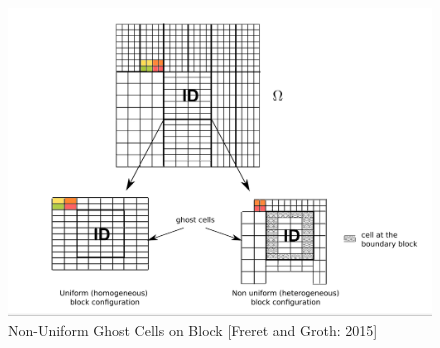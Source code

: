\begin{enumerate}
\begin{figure}
    \vspace{0.2cm}
    \begin{center}
      \includegraphics[height=0.35\textwidth]{./figs/Non-UniformBlock.png}
    \end{center}
    \caption{Non-Uniform Ghost Cells on Block [Freret and Groth: 2015] \cite{Freret:2015}}  
    \vspace{0.2cm}
\end{figure}

\end{enumerate}

